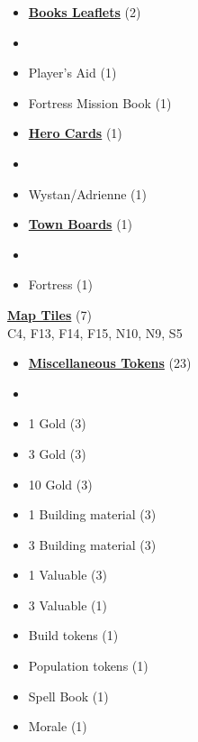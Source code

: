 
\begin{multicols*}{3}

\footnotesize

\begin{itemize}[leftmargin=0pt, label={}, noitemsep]
  \item \textbf{\small{\underline{Books Leaflets}}} (2)
  \item
  \item Player's Aid (1)
  \item Fortress Mission Book (1)
\end{itemize}

\begin{itemize}[leftmargin=0pt, label={}, noitemsep]
  \item \textbf{\small{\underline{Hero Cards}}} (1)
  \item
  \item Wystan/Adrienne (1)
\end{itemize}

\begin{itemize}[leftmargin=0pt, label={}, noitemsep]
  \item \textbf{\small{\underline{Town Boards}}} (1)
  \item
  \item Fortress (1)
\end{itemize}

\textbf{\small{\underline{Map Tiles}}} (7)\\

C4, F13, F14, F15, N10, N9, S5

\begin{itemize}[leftmargin=0pt, label={}, noitemsep]
  \item \textbf{\small{\underline{Miscellaneous Tokens}}} (23)
  \item
  \item 1 Gold (3)
  \item 3 Gold (3)
  \item 10 Gold (3)
  \item 1 Building material (3)
  \item 3 Building material (3)
  \item 1 Valuable (3)
  \item 3 Valuable (1)
  \item Build tokens (1)
  \item Population tokens (1)
  \item Spell Book (1)
  \item Morale (1)
\end{itemize}


\end{multicols*}
